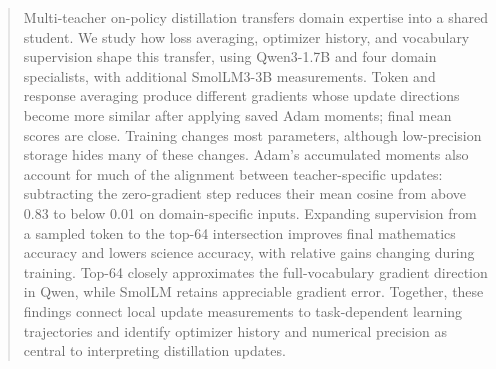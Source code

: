 \begin{abstract}
Multi-teacher on-policy distillation transfers domain expertise into a shared student. We study how loss averaging, optimizer history, and vocabulary supervision shape this transfer, using Qwen3-1.7B and four domain specialists, with additional SmolLM3-3B measurements. Token and response averaging produce different gradients whose update directions become more similar after applying saved Adam moments; final mean scores are close. Training changes most parameters, although low-precision storage hides many of these changes. Adam's accumulated moments also account for much of the alignment between teacher-specific updates: subtracting the zero-gradient step reduces their mean cosine from above 0.83 to below 0.01 on domain-specific inputs. Expanding supervision from a sampled token to the top-64 intersection improves final mathematics accuracy and lowers science accuracy, with relative gains changing during training. Top-64 closely approximates the full-vocabulary gradient direction in Qwen, while SmolLM retains appreciable gradient error. Together, these findings connect local update measurements to task-dependent learning trajectories and identify optimizer history and numerical precision as central to interpreting distillation updates.
\end{abstract}
